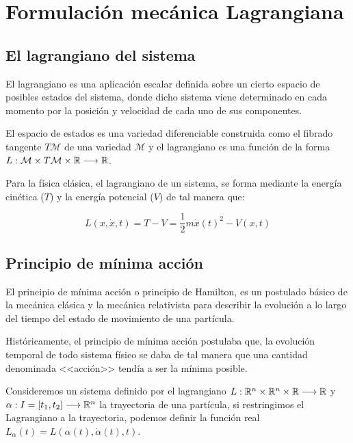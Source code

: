 \chapter{Formulación mecánica Lagrangiana}


\section{El lagrangiano del sistema}

El lagrangiano es una aplicación escalar definida sobre un cierto espacio de posibles estados del sistema, donde dicho sistema viene determinado en cada momento por la posición y velocidad de cada uno de sus componentes.

El espacio de estados es una variedad diferenciable construida como el fibrado tangente $T\mathcal{M}$ de una variedad $\mathcal{M}$ y el lagrangiano es una función de la forma $L:\mathcal{M}\times T\mathcal{M}\times\mathbb{R}\longrightarrow \mathbb{R}$.

Para la física clásica, el lagrangiano de un sistema, se forma mediante la energía cinética ($T$) y la energía potencial ($V$) de tal manera que:
\begin{postulate}
    \begin{equation}
        \label{eq:lagrangiano_clasico}
        L(x,\dot{x},t)=T-V=\frac{1}{2}m\dot{x}(t)^2-V(x,t)
    \end{equation}
\end{postulate}


\section{Principio de mínima acción}

El principio de mínima acción o principio de Hamilton, es un postulado básico de la mecánica clásica y la mecánica relativista para describir la evolución a lo largo del tiempo del estado de movimiento de una partícula.

Históricamente, el principio de mínima acción postulaba que, la evolución temporal de todo sistema físico se daba de tal manera que una cantidad denominada <<acción>> tendía a ser la mínima posible.

Consideremos un sistema definido por el lagrangiano $L:\mathbb{R}^n\times\mathbb{R}^n\times\mathbb{R}\longrightarrow \mathbb{R}$ y $\alpha:I=[t_1, t_2]\longrightarrow \mathbb{R}^n$ la trayectoria de una partícula, si restringimos el Lagrangiano a la trayectoria, podemos definir la función real $L_\alpha(t)=L(\alpha(t), \dot{\alpha}(t), t)$.

